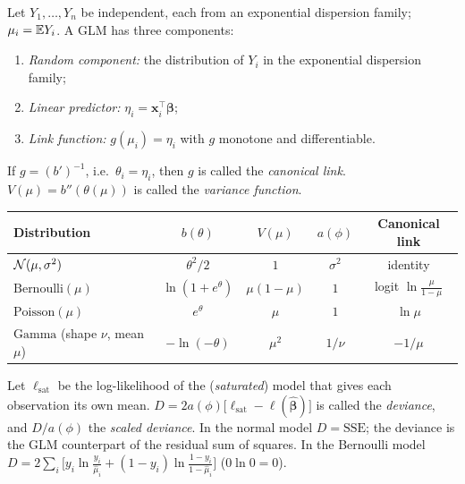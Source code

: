 \documentclass[main.tex]{subfiles}
\begin{document}
\begin{definition}\label{def:glm}
Let $Y_1,\dots,Y_n$ be independent, each from an exponential dispersion family; $\mu_i=\mathbb{E} Y_i$. A GLM has three components:
\begin{enumerate}
  \item \emph{Random component:} the distribution of $Y_i$ in the exponential dispersion family;
  \item \emph{Linear predictor:} $\eta_i=\mathbf x_i^\top\bm\beta$;
  \item \emph{Link function:} $g(\mu_i)=\eta_i$ with $g$ monotone and differentiable.
\end{enumerate}
If $g=(b')^{-1}$, i.e.\ $\theta_i=\eta_i$, then $g$ is called the \emph{canonical link}. $V(\mu)=b''(\theta(\mu))$ is called the \emph{variance function}.
\begin{center}
\begin{tabular}{lcccc}
\toprule
Distribution & $b(\theta)$ & $V(\mu)$ & $a(\phi)$ & Canonical link\\
\midrule
$\mathcal{N}(\mu,\sigma^2)$ & $\theta^2/2$ & $1$ & $\sigma^2$ & identity\\
$\text{Bernoulli}(\mu)$ & $\ln(1+e^\theta)$ & $\mu(1-\mu)$ & $1$ & logit $\ln\frac{\mu}{1-\mu}$\\
$\text{Poisson}(\mu)$ & $e^\theta$ & $\mu$ & $1$ & $\ln\mu$\\
$\text{Gamma}$ (shape $\nu$, mean $\mu$) & $-\ln(-\theta)$ & $\mu^2$ & $1/\nu$ & $-1/\mu$\\
\bottomrule
\end{tabular}
\end{center}
\end{definition}

\begin{definition}[Deviance]\label{def:sapma}
Let $\ell_{\text{sat}}$ be the log-likelihood of the (\emph{saturated}) model that gives each observation its own mean. $D=2a(\phi)\big[\ell_{\text{sat}}-\ell(\hat{\bm\beta})\big]$ is called the \emph{deviance}, and $D/a(\phi)$ the \emph{scaled deviance}. In the normal model $D=\mathrm{SSE}$; the deviance is the GLM counterpart of the residual sum of squares. In the Bernoulli model $D=2\sum_i\big[y_i\ln\frac{y_i}{\hat\mu_i}+(1-y_i)\ln\frac{1-y_i}{1-\hat\mu_i}\big]$ ($0\ln0=0$).
\end{definition}
\end{document}
